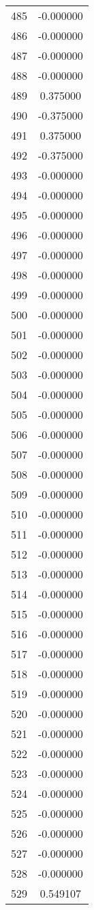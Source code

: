 \documentclass[12pt]{article}
\begin{document}
\begin{longtable}{@{}cc@{}}
485 & -0.000000 \\
486 & -0.000000 \\
487 & -0.000000 \\
488 & -0.000000 \\
489 & 0.375000 \\
490 & -0.375000 \\
491 & 0.375000 \\
492 & -0.375000 \\
493 & -0.000000 \\
494 & -0.000000 \\
495 & -0.000000 \\
496 & -0.000000 \\
497 & -0.000000 \\
498 & -0.000000 \\
499 & -0.000000 \\
500 & -0.000000 \\
501 & -0.000000 \\
502 & -0.000000 \\
503 & -0.000000 \\
504 & -0.000000 \\
505 & -0.000000 \\
506 & -0.000000 \\
507 & -0.000000 \\
508 & -0.000000 \\
509 & -0.000000 \\
510 & -0.000000 \\
511 & -0.000000 \\
512 & -0.000000 \\
513 & -0.000000 \\
514 & -0.000000 \\
515 & -0.000000 \\
516 & -0.000000 \\
517 & -0.000000 \\
518 & -0.000000 \\
519 & -0.000000 \\
520 & -0.000000 \\
521 & -0.000000 \\
522 & -0.000000 \\
523 & -0.000000 \\
524 & -0.000000 \\
525 & -0.000000 \\
526 & -0.000000 \\
527 & -0.000000 \\
528 & -0.000000 \\
529 & 0.549107 \\

\end{longtable}
\end{document}
